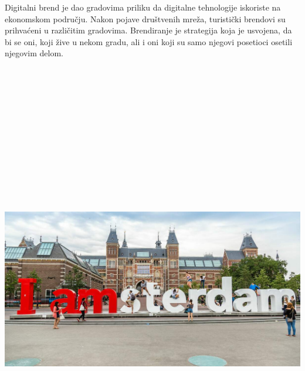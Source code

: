 \documentclass[a0,portrait]{a0poster}
\begin{document}
\begin{multicols}{2}
\Large{
Digitalni brend je dao gradovima priliku da digitalne tehnologije iskoriste na ekonomskom području. Nakon pojave društvenih mreža, turistički brendovi su prihvaćeni u različitim gradovima. Brendiranje je strategija koja je usvojena, da bi se oni, koji žive u nekom gradu, ali i oni koji su samo njegovi posetioci osetili njegovim delom.
}

\begin{center}\vspace{1cm}
\includegraphics[width=30cm,height=20cm]{rijksmuseum-amsterdam-museum-iamsterdam.jpg}
\end{center}\vspace{1cm}


\end{multicols}
\end{document}
